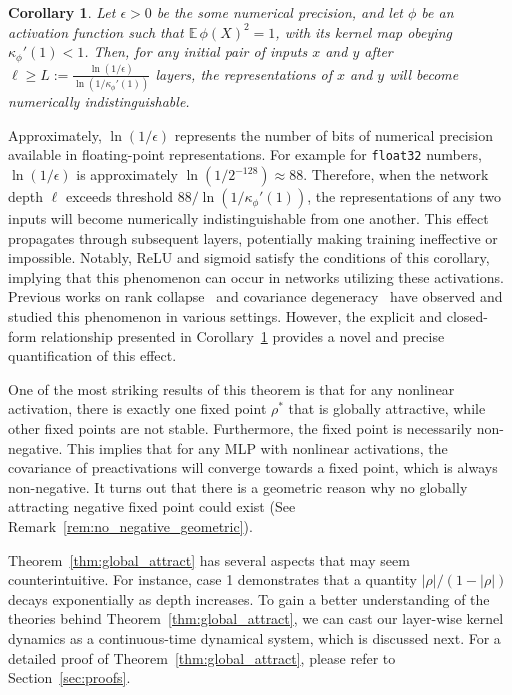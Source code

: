 \documentclass[twoside]{article}
\newcommand{\km}{\kappa_\phi}
\newcommand{\E}{\mathbb{E}\,}
\newtheorem{corollary}{Corollary}
\theoremstyle{definition}
\begin{document}
\begin{corollary}
\label{cor:convergence_precision}
Let $\epsilon > 0$ be the some numerical precision, and let $\phi$ be an activation function such that $\E\phi(X)^2=1$, with its kernel map obeying $\km'(1) < 1$. Then, for any initial pair of inputs $x$ and $y$ after $\ell \ge L:= \frac{\ln(1/\epsilon)}{\ln(1/\km'(1))}$ layers, the representations of $x$ and $y$ will become numerically indistinguishable.
\end{corollary}

Approximately, $\ln(1/\epsilon)$ represents the number of bits of numerical precision available in floating-point representations. For example for \texttt{float32} numbers, $\ln(1/\epsilon)$ is approximately $\ln(1/2^{-128}) \approx 88$. Therefore, when the network depth $\ell$ exceeds threshold $88/\ln(1/\km'(1))$, the representations of any two inputs will become numerically indistinguishable from one another. This effect propagates through subsequent layers, potentially making training ineffective or impossible. Notably, ReLU and sigmoid satisfy the conditions of this corollary, implying that this phenomenon can occur in networks utilizing these activations. Previous works on rank collapse~\citep{daneshmand2020batch,noci2022signal} and covariance degeneracy~\citep{li2022neural} have observed and studied this phenomenon in various settings. However, the explicit and closed-form relationship presented in Corollary~\ref{cor:convergence_precision} provides a novel and precise quantification of this effect.

One of the most striking results of this theorem is that for any nonlinear activation, there is exactly one fixed point $\rho^*$ that is globally attractive, while other fixed points are not stable. Furthermore, the fixed point is necessarily non-negative. This implies that for any MLP with nonlinear activations, the covariance of preactivations will converge towards a fixed point, which is always non-negative. 
It turns out that there is a geometric reason why no globally attracting negative fixed point could exist (See Remark~\ref{rem:no_negative_geometric}).

Theorem~\ref{thm:global_attract} has several aspects that may seem counterintuitive. For instance, case 1 demonstrates that a quantity $|\rho|/(1-|\rho|)$ decays exponentially as depth increases. To gain a better understanding of the theories behind Theorem~\ref{thm:global_attract}, we can cast our layer-wise kernel dynamics as a continuous-time dynamical system, which is discussed next. For a detailed proof of Theorem~\ref{thm:global_attract}, please refer to Section~\ref{sec:proofs}.
\end{document}
